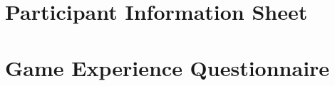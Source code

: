 \documentclass[msc,deptreport,ai]{infthesis}      %
\begin{document}



\appendix

\chapter{Participant Information Sheet}


\chapter{Game Experience Questionnaire}


\end{document}
